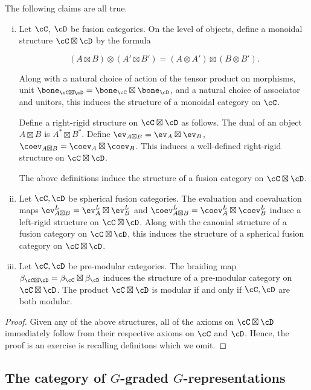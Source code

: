 \begin{prop} The following claims are all true.

\begin{enumerate}[(i)]
\item Let $\cC$, $\cD$ be fusion categories. On the level of objects, define a monoidal structure $\cC\boxtimes \cD$ by the formula

$$(A\boxtimes B)\otimes (A'\boxtimes B')= (A\otimes A')\boxtimes (B\otimes B').$$

Along with a natural choice of action of the tensor product on morphisms, unit $\bone_{\cC\boxtimes \cD}=\bone_{\cC}\boxtimes \bone_{\cD}$, and a natural choice of associator and unitors, this induces the structure of a monoidal category on $\cC$.

Define a right-rigid structure on $\cC\boxtimes \cD$ as follows. The dual of an object $A\boxtimes B$ is $A^*\boxtimes B^*$. Define $\ev_{A\boxtimes B}=\ev_{A}\boxtimes \ev_{B}$, $\coev_{A\boxtimes B}= \coev_{A}\boxtimes \coev_{B}$. This induces a well-defined right-rigid structure on $\cC\boxtimes \cD$.

The above definitions induce the structure of a fusion category on $\cC\boxtimes \cD$. 

\item Let $\cC,\cD$ be spherical fusion categories. The evaluation and coevaluation maps $\ev^{L}_{A\boxtimes B} = \ev^{L}_{A}\boxtimes \ev^{L}_B$ and $\coev^{L}_{A\boxtimes B}=\coev^{L}_{A}\boxtimes \coev^{L}_{B}$ induce a left-rigid structure on $\cC\boxtimes \cD$. Along with the canonial structure of a fusion category on $\cC\boxtimes \cD$, this induces the structure of a spherical fusion category on $\cC\boxtimes \cD$.

\item Let $\cC,\cD$ be pre-modular categories. The braiding map $\beta_{\cC\boxtimes \cD}=\beta_{\cC}\boxtimes \beta_{\cD}$ induces the structure of a pre-modular category on $\cC\boxtimes \cD$. The product $\cC\boxtimes \cD$ is modular if and only if $\cC,\cD$ are both modular.
\end{enumerate}
\end{prop}
\begin{proof} Given any of the above structures, all of the axioms on $\cC\boxtimes \cD$ immediately follow from their respective axioms on $\cC$ and $\cD$. Hence, the proof is an exercise is recalling definitons which we omit.
\end{proof}


\subsection{The category of $G$-graded $G$-representations}

